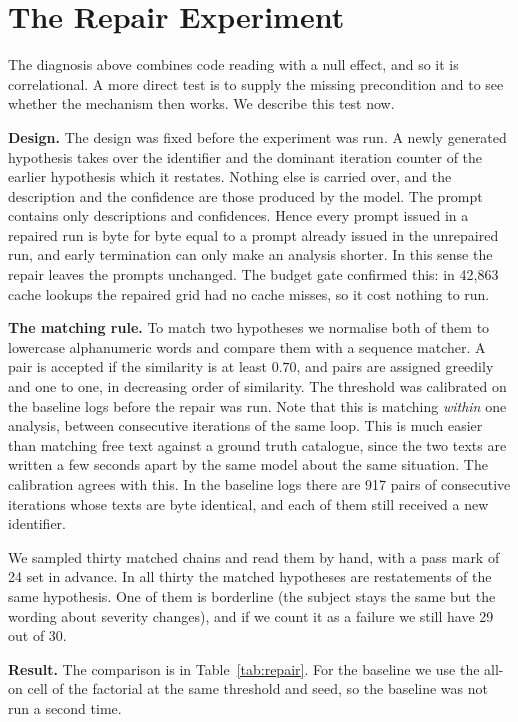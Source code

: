 \documentclass[conference]{IEEEtran}
\begin{document}
\section{The Repair Experiment}
\label{sec:repair}

The diagnosis above combines code reading with a null effect, and so it is
correlational. A more direct test is to supply the missing precondition and to
see whether the mechanism then works. We describe this test now.

\textbf{Design.}
The design was fixed before the experiment was run. A newly generated
hypothesis takes over the identifier and the dominant iteration counter of the
earlier hypothesis which it restates. Nothing else is carried over, and the
description and the confidence are those produced by the model. The prompt
contains only descriptions and confidences. Hence every prompt issued in a
repaired run is byte for byte equal to a prompt already issued in the
unrepaired run, and early termination can only make an analysis shorter. In
this sense the repair leaves the prompts unchanged. The budget gate confirmed
this: in 42{,}863 cache lookups the repaired grid had no cache misses, so it
cost nothing to run.

\textbf{The matching rule.}
To match two hypotheses we normalise both of them to lowercase alphanumeric
words and compare them with a sequence matcher. A pair is accepted if the
similarity is at least $0.70$, and pairs are assigned greedily and one to one,
in decreasing order of similarity. The threshold was calibrated on the
baseline logs before the repair was run. Note that this is matching
\emph{within} one analysis, between consecutive iterations of the same loop.
This is much easier than matching free text against a ground truth catalogue,
since the two texts are written a few seconds apart by the same model about
the same situation. The calibration agrees with this. In the baseline logs
there are 917 pairs of consecutive iterations whose texts are byte identical,
and each of them still received a new identifier.

We sampled thirty matched chains and read them by hand, with a pass mark of 24
set in advance. In all thirty the matched hypotheses are restatements of the
same hypothesis. One of them is borderline (the subject stays the same but the
wording about severity changes), and if we count it as a failure we still have
29 out of 30.

\textbf{Result.} The comparison is in Table~\ref{tab:repair}. For the baseline
we use the all-on cell of the factorial at the same threshold and seed, so the
baseline was not run a second time.
\end{document}
